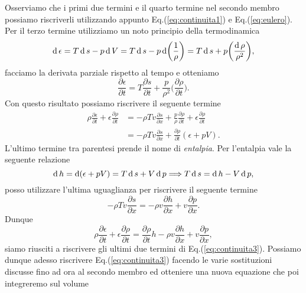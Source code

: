 Osserviamo che i primi due termini e il quarto termine nel secondo membro possiamo riscriverli utilizzando appunto Eq.(\ref{eq:continuita1}) e Eq.(\ref{eq:eulero}). Per il terzo termine utilizziamo un noto principio della termodinamica
\begin{equation*}
    \operatorname{d} \epsilon = T \operatorname{d} s - p \operatorname{d} V = T \operatorname{d} s - p \operatorname{d} \biggl( \frac{1}{\rho} \biggr) = T \operatorname{d} s + p \biggl( \frac{\operatorname{d} \rho}{\rho^2} \biggr),
\end{equation*}
facciamo la derivata parziale rispetto al tempo e otteniamo 
\begin{equation*}
    \frac{\partial \epsilon}{\partial t} = T \frac{\partial s}{\partial t} + \frac{p}{\rho^2} \biggl( \frac{\partial \rho}{\partial t} \biggr).
\end{equation*}
Con questo risultato possiamo riscrivere il seguente termine 
\begin{equation*}
    \begin{split}
        \rho \frac{\partial \epsilon}{\partial t} + \epsilon \frac{\partial \rho}{\partial t} & = - \rho Tv \frac{\partial s}{\partial x} + \frac{p}{\rho} \frac{\partial \rho}{\partial t} + \epsilon \frac{\partial \rho}{\partial t}\\
                                                                                              & = - \rho Tv \frac{\partial s}{\partial x} + \frac{\partial \rho}{\partial t} (\epsilon + pV).
    \end{split}
\end{equation*}
L'ultimo termine tra parentesi prende il nome di \emph{entalpia}. Per l'entalpia vale la seguente relazione
\begin{equation*}
    \operatorname{d} h = \operatorname{d} (\epsilon + pV) = T \operatorname{d} s + V \operatorname{d} p \Longrightarrow T \operatorname{d} s = \operatorname{d} h - V \operatorname{d} p,
\end{equation*}
posso utilizzare l'ultima uguaglianza per riscrivere il seguente termine
\begin{equation*}
    - \rho T v \frac{\partial s}{\partial x} = - \rho v \frac{\partial h}{\partial x} + v \frac{\partial p}{\partial x}.
\end{equation*}
Dunque 
\begin{equation*}
    \rho \frac{\partial \epsilon}{\partial t} + \epsilon \frac{\partial \rho}{\partial t} = \frac{\partial \rho}{\partial t} h - \rho v \frac{\partial h}{\partial x} + v \frac{\partial p}{\partial x},
\end{equation*}
siamo riusciti a riscrivere gli ultimi due termini di Eq.(\ref{eq:continuita3}). Possiamo dunque adesso riscrivere Eq.(\ref{eq:continuita3}) facendo le varie sostituzioni discusse fino ad ora al secondo membro ed otteniere una nuova equazione che poi integreremo sul volume
